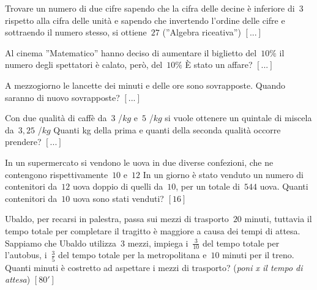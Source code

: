 \begin{multicols}{2}
\begin{esercizio}
\label{ese:14.45}
Trovare un numero di due cifre sapendo che la cifra delle decine è inferiore 
di~$3$ rispetto alla cifra delle unità e sapendo che invertendo l'ordine delle 
cifre e sottraendo il numero stesso, si ottiene~$27$ (''Algebra riceativa'')
 \hfill $\left[...\right]$
\end{esercizio}

\begin{esercizio}
\label{ese:14.46}
Al cinema ''Matematico'' hanno deciso di aumentare il biglietto del~$10 \%$ il 
numero degli spettatori è calato, però, del~$10 \%$ È stato un affare?
 \hfill $\left[...\right]$
\end{esercizio}

\begin{esercizio}
\label{ese:14.47}
A mezzogiorno le lancette dei minuti e delle ore sono sovrapposte. Quando 
saranno di nuovo sovrapposte? \hfill $\left[...\right]$
\end{esercizio}

\begin{esercizio}
\label{ese:14.48}
Con due qualità di caffè da~$3$ \officialeuro/$\unit{kg}$ e~$5$ 
\officialeuro/$\unit{kg}$ si vuole ottenere un quintale di miscela da~$3,25$ 
\officialeuro/$\unit{kg}$ Quanti kg della prima e quanti della seconda qualità 
occorre prendere? \hfill $\left[...\right]$
\end{esercizio}

\begin{esercizio}[\Ast]
\label{ese:14.49}
In un supermercato si vendono le uova in due diverse confezioni, che ne 
contengono rispettivamente~$10$ e~$12$ In un giorno è stato venduto un numero di 
contenitori da~$12$ uova doppio di quelli da~$10$, per un totale di~$544$ uova. 
Quanti contenitori da~$10$ uova sono stati venduti? \hfill $\left[16\right]$
\end{esercizio}

\begin{esercizio}[\Ast]
\label{ese:14.50}
Ubaldo, per recarsi in palestra, passa sui mezzi di trasporto~$20$ minuti, 
tuttavia il tempo totale per completare il tragitto è maggiore a causa dei tempi 
di attesa. Sappiamo che Ubaldo utilizza~$3$ mezzi, impiega i~$\frac{3}{10}$ del 
tempo totale per l'autobus, i~$\frac{3}{5}$ del tempo totale per la 
metropolitana e~$10$ minuti per il treno. Quanti minuti è costretto ad aspettare 
i mezzi di trasporto? (\emph{poni x il tempo di attesa})
 \hfill $\left[80'\right]$
\end{esercizio}


\end{multicols}
